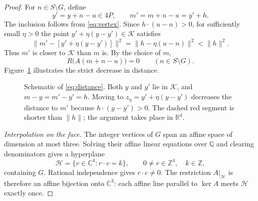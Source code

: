 \documentclass[11pt,a4paper]{amsart}
\theoremstyle{remark}
\newcommand{\Q}{\mathbb Q}
\newcommand{\Z}{\mathbb Z}
\newcommand{\C}{\mathbb C}
\newcommand{\R}{\mathbb R}
\newcommand{\cK}{\mathcal K}
\numberwithin{equation}{section}
\begin{document}
\begin{proof}
For $n\in S\setminus G$, define
\[
 y'=y+n-u\in4P,\qquad m'=m+n-u=y'+h.
\]
The inclusion follows from \eqref{eq:vertex}. Since
$h\cdot(u-n)>0$, for sufficiently small $\eta>0$ the point
$y'+\eta(y-y')\in\cK$ satisfies
\begin{equation}\label{eq:distance}
 \bigl\|m'-[y'+\eta(y-y')]\bigr\|^2
 =\|h-\eta(u-n)\|^2<\|h\|^2.
\end{equation}
Thus $m'$ is closer to $\cK$ than $m$ is. By the choice of $m$,
\begin{equation}\label{eq:offface}
 R\bigl(A(m+n-u)\bigr)=0\qquad(n\in S\setminus G).
\end{equation}
Figure~\ref{fig:nearest} illustrates the strict decrease in distance.

\begin{figure}[ht]
\centering
{}
\caption{Schematic of \eqref{eq:distance}. Both $y$ and $y'$ lie in
$\cK$, and $m-y=m'-y'=h$. Moving to $z_\eta=y'+\eta(y-y')$ decreases the
distance to $m'$ because $h\cdot(y-y')>0$. The dashed red segment is
shorter than $\|h\|$; the argument takes place in $\R^4$.}
\label{fig:nearest}
\end{figure}

\smallskip\noindent
\emph{Interpolation on the face.}
The integer vertices of $G$ span an affine space of dimension at most
three. Solving their affine linear equations over $\Q$ and clearing
denominators gives a hyperplane
\[
 \mathcal H=\{v\in\C^4:r\cdot v=k\},
 \qquad 0\ne r\in\Z^4,\quad k\in\Z,
\]
containing $G$. Rational independence gives $r\cdot c\ne0$.
The restriction $A|_{\mathcal H}$ is therefore an affine bijection
onto $\C^3$: each affine line parallel to $\ker A$ meets
$\mathcal H$ exactly once.


\end{proof}
\end{document}
